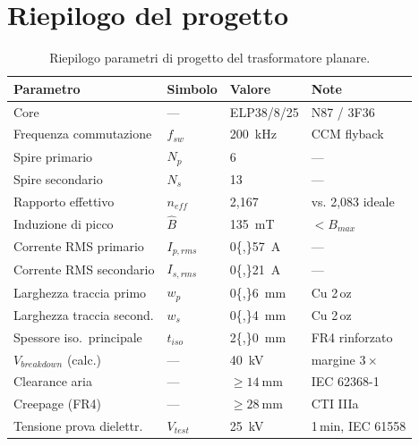 \documentclass[a4paper,11pt]{article}
\begin{document}
\section{Riepilogo del progetto}

\begin{table}[H]
\centering
\caption{Riepilogo parametri di progetto del trasformatore planare.}
\label{tab:summary}
\begin{tabularx}{\linewidth}{L{5.5cm} C{2.5cm} C{2.5cm} L{3cm}}
\toprule
\textbf{Parametro} & \textbf{Simbolo} & \textbf{Valore} & \textbf{Note} \\
\midrule
Core                      & —       & ELP38/8/25      & N87 / 3F36          \\
Frequenza commutazione    & $f_{sw}$& \SI{200}{\kilo\hertz} & CCM flyback   \\
Spire primario            & $N_p$   & 6               & —                   \\
Spire secondario          & $N_s$   & 13              & —                   \\
Rapporto effettivo        & $n_{eff}$& 2{,}167        & vs. 2{,}083 ideale  \\
Induzione di picco        & $\hat{B}$& \SI{135}{\milli\tesla} & $<B_{max}$  \\
Corrente RMS primario     & $I_{p,rms}$ & \SI{0{,}57}{\ampere} & —         \\
Corrente RMS secondario   & $I_{s,rms}$ & \SI{0{,}21}{\ampere} & —         \\
Larghezza traccia primo   & $w_p$   & \SI{0{,}6}{\milli\metre} & Cu 2\,oz \\
Larghezza traccia second. & $w_s$   & \SI{0{,}4}{\milli\metre} & Cu 2\,oz \\
Spessore iso.\ principale & $t_{iso}$& \SI{2{,}0}{\milli\metre} & FR4 rinforzato \\
$V_{breakdown}$ (calc.)  & —       & \SI{40}{\kilo\volt}  & margine $3\times$ \\
Clearance aria            & —       & $\geq\SI{14}{\milli\metre}$ & IEC 62368-1 \\
Creepage (FR4)            & —       & $\geq\SI{28}{\milli\metre}$ & CTI IIIa    \\
Tensione prova dielettr.  & $V_{test}$ & \SI{25}{\kilo\volt}  & 1\,min, IEC 61558 \\
\bottomrule
\end{tabularx}
\end{table}
\end{document}
